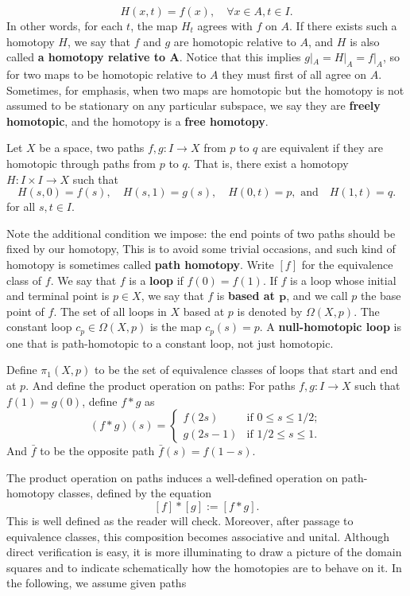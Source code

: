 \[H(x,t)=f(x),\quad\forall x\in A,t\in I.\]
In other words, for each $t$, the map $H_t$ agrees with $f$ on $A$. If there exists such a homotopy $H$, we say that $f$ and $g$ are homotopic relative to $A$, and $H$ is also called \textbf{a homotopy relative to $\bm{A}$}. Notice that this implies $g|_A=H|_A=f|_A$, so for two maps to be homotopic relative to $A$ they must first of all agree on $A$. Sometimes, for emphasis, when two maps are homotopic but the homotopy is not assumed to be
stationary on any particular subspace, we say they are \textbf{freely homotopic}, and the homotopy is a \textbf{free homotopy}.\par
\begin{definition}
Let $X$ be a space, two paths $f,g:I\to X$ from $p$ to $q$ are equivalent if they are homotopic through paths from $p$ to $q$. That is, there exist a homotopy $H:I\times I\to X$ such that
\[H(s,0)=f(s),\quad H(s,1)=g(s),\quad H(0,t)=p,\text{ and}\quad H(1,t)=q.\]
for all $s,t\in I$.
\end{definition}
Note the additional condition we impose: the end points of two paths should be fixed by our homotopy, This is to avoid some trivial occasions, and such kind of homotopy is sometimes called \textbf{path homotopy}. Write $[f]$ for the equivalence class of $f$. We say that $f$ is a \textbf{loop} if $f(0)=f(1)$. If $f$ is a loop whose initial and terminal point is $p\in X$, we say that $f$ is \textbf{based at $\bm{p}$}, and we call $p$ the base point of $f$. The set of all loops in $X$ based at $p$ is denoted by $\Omega(X,p)$. The constant loop $c_p\in\Omega(X,p)$ is the map $c_p(s)=p$. A \textbf{null-homotopic loop} is one that is path-homotopic to a constant loop, not just homotopic.\par 
Define $\pi_1(X,p)$ to be the set of equivalence classes of loops that start and end at $p$. And define the product operation on paths: For paths $f,g:I\to X$ such that $f(1)=g(0)$, define $f\ast g$ as
\[(f\ast g)(s)=\begin{cases}
f(2s)&\text{if }0\leq s\leq 1/2;\\
g(2s-1)&\text{if }1/2\leq s\leq 1.
\end{cases}\]
And $\bar{f}$ to be the opposite path $\bar{f}(s)=f(1-s)$.\par 
The product operation on paths induces a well-defined operation on path-homotopy classes, defined by the equation
\[[f]\ast[g]:=[f\ast g].\]
This is well defined as the reader will check. Moreover, after passage to equivalence classes, this composition becomes associative and unital. Although direct verification is easy, it is more illuminating to draw a picture of the domain squares and to indicate schematically how the homotopies are to behave on it. In the following, we assume given paths
